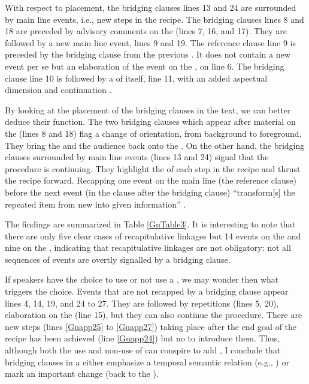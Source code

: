 \documentclass[output=paper]{LSP/langsci}
\begin{document}
With respect to placement, the bridging clauses lines 13 and 24 are surrounded by main line events, i.e., new steps in the recipe. The bridging clauses lines 8 and 18 are preceded by advisory comments on the  (lines 7, 16, and 17). They are followed by a new main line event, lines 9 and 19. The reference clause line 9 is preceded by the bridging clause from the previous . It does not contain a new event per se but an elaboration of the event on the , on line 6. The bridging clause line 10 is followed by a  of itself, line 11, with an added aspectual dimension and continuation . 

By looking at the placement of the bridging clauses in the text, we can better deduce their function. The two bridging clauses which appear after material on the  (lines 8 and 18) flag a change of orientation, from background to foreground. They bring the  and the audience back onto the . On the other hand, the bridging clauses surrounded by main line events (lines 13 and 24) signal that the procedure is continuing. They highlight the  of each step in the recipe and thrust the recipe forward. Recapping one event on the main line (the reference clause) before the next event (in the clause after the bridging clause) ``transform[s] the repeated item from new into given information'' \citep[][224]{brown.2000}.   

The findings are summarized in Table \ref{GuTable3}. It is interesting to note that there are only five clear cases of recapitulative linkages but 14 events on the  and nine on the , indicating that recapitulative linkages are not obligatory: not all sequences of events are overtly signalled by a bridging clause. 

If speakers have the choice to use or not use a , we may wonder then what triggers the choice. Events that are not recapped by a bridging clause appear lines 4, 14, 19, and 24 to 27.  They are followed by repetitions (lines 5, 20), elaboration on the  (line 15), but they can also continue the procedure. There are new steps (lines \ref{Guapp25} to \ref{Guapp27}) taking place after the end goal of the recipe has been achieved  (line \ref{Guapp24}) but no  to introduce them. Thus, although both the use and non-use of  can conspire to add , I conclude that bridging clauses in a  either emphasize a temporal semantic relation (e.g., ) or mark an important  change (back to the ). 
\end{document}
